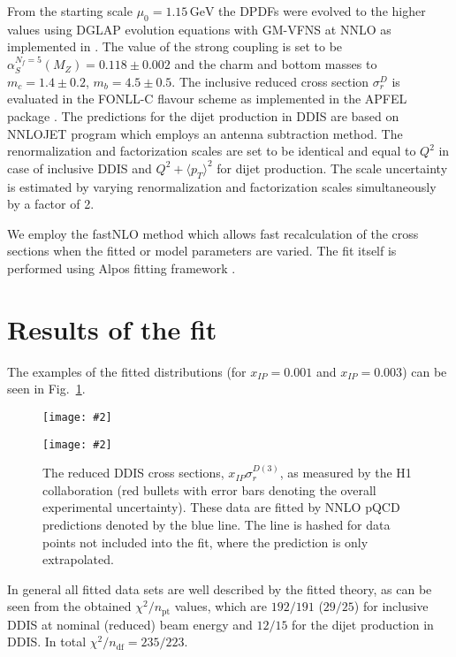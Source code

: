 \documentclass{PoS}
\newcommand{\IP}{I\!\!P}
\newcommand{\GeV}{\ensuremath{\mathrm{GeV}}\xspace}
\newcommand{\includegraphicss}[2][]{\texttt{[image: \#2]}}
\begin{document}
From the starting scale $\mu_0 = 1.15\,\GeV$ the DPDFs were evolved to the higher values using DGLAP evolution equations with GM-VFNS at NNLO as implemented in \cite{Botje:2010ay,Bertone:2013vaa}.
The value of the strong coupling is set to be $\alpha_S^{N_f = 5} (M_Z) = 0.118\pm 0.002$ and the charm and bottom masses to $m_c = 1.4\pm 0.2$, $m_b = 4.5\pm 0.5$.
The inclusive reduced cross section $\sigma_r^D$ is evaluated in the \mbox{FONLL-C} flavour scheme \cite{Cacciari:1998it} as implemented in the APFEL package \cite{Bertone:2013vaa}.
The predictions for the dijet production in DDIS are based on NNLOJET program \cite{Currie:2016ytq} which employs an antenna subtraction method.
The renormalization and factorization scales are set to be identical and equal to $Q^2$ in case of inclusive DDIS and $Q^2 + \langle p_T\rangle^2$ for dijet production.
The scale uncertainty is estimated by varying renormalization and factorization scales simultaneously by a factor of 2.

We employ the fastNLO method \cite{Britzger:2012bs} which allows fast recalculation of the cross sections when the fitted or model parameters are varied.
The fit itself is performed using Alpos fitting framework \cite{yyy}.

\section{Results of the fit}

The examples of the fitted distributions (for $x_{\IP} = 0.001$ and $x_{\IP} = 0.003$) can be seen in Fig.~\ref{figDDISfit}.
\begin{figure}[h]
\centering
\begin{minipage}[t]{0.47\textwidth}
\includegraphicss[trim={0cm 0.0cm 0 0.0cm},clip,width=.9\textwidth]{{{plots/H1prelim-19-013.fig11}}}
\end{minipage}
\begin{minipage}[t]{0.47\textwidth}
\includegraphicss[trim={0cm 1.2cm 0 1.1cm},clip,width=.9\textwidth]{{{plots/H1prelim-19-013.fig10}}}
\end{minipage}
\caption{The reduced DDIS cross sections, $x_{\IP}\sigma_r^{D(3)}$, as measured by the H1 collaboration (red bullets with error bars denoting the overall experimental uncertainty). These data are fitted by NNLO pQCD predictions denoted by the blue line. The line is hashed for data points not included into the fit, where the prediction is only extrapolated.}
\label{figDDISfit}
\end{figure}
In general all fitted data sets are well described by the fitted theory, as can be seen from the obtained $\chi^2/n_\mathrm{pt}$ values, which are $192/191$ ($29/25$) for inclusive DDIS at nominal (reduced) beam energy and $12/15$ for the dijet production in DDIS.
In total $\chi^2/n_\mathrm{df} = 235/223$.
\end{document}
